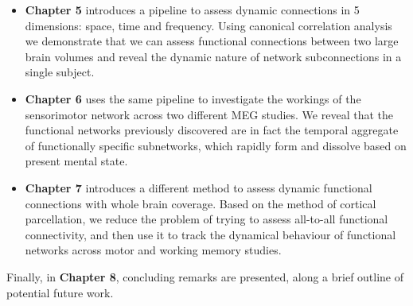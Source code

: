 \begin{itemize}
	\item \textbf{Chapter 5} introduces a pipeline to assess dynamic connections in 5 dimensions: space, time and frequency. Using canonical correlation analysis we demonstrate that we can assess functional connections between two large brain volumes and reveal the dynamic nature of network subconnections in a single subject.
	\item \textbf{Chapter 6} uses the same pipeline to investigate the workings of the sensorimotor network across two different MEG studies. We reveal that the functional networks previously discovered are in fact the temporal aggregate of functionally specific subnetworks, which rapidly form and dissolve based on present mental state.
	\item \textbf{Chapter 7} introduces a different method to assess dynamic functional connections with whole brain coverage. Based on the method of cortical parcellation, we reduce the problem of trying to assess all-to-all functional connectivity, and then use it to track the dynamical behaviour of functional networks across motor and working memory studies.
\end{itemize} Finally, in \textbf{Chapter 8}, concluding remarks are presented, along a brief outline of potential future work.
	
